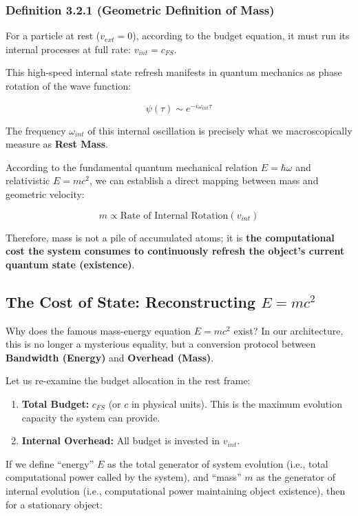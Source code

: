 \documentclass[11pt,a4paper,twoside]{book}
\begin{document}
\subsubsection{Definition 3.2.1 (Geometric Definition of Mass)}

For a particle at rest (\textbf{$v_{ext}=0$}), according to the budget equation, it must run its internal processes at full rate: \textbf{$v_{int} = c_{FS}$}.

This high-speed internal state refresh manifests in quantum mechanics as phase rotation of the wave function:

$$\psi(\tau) \sim e^{-i \omega_{int} \tau}$$

The frequency \textbf{$\omega_{int}$} of this internal oscillation is precisely what we macroscopically measure as \textbf{Rest Mass}.

According to the fundamental quantum mechanical relation \textbf{$E = \hbar \omega$} and relativistic \textbf{$E = mc^2$}, we can establish a direct mapping between mass and geometric velocity:

$$m \propto \text{Rate of Internal Rotation} (v_{int})$$

Therefore, mass is not a pile of accumulated atoms; it is \textbf{the computational cost the system consumes to continuously refresh the object's current quantum state (existence)}.

\subsection{The Cost of State: Reconstructing $E=mc^2$}

Why does the famous mass-energy equation \textbf{$E=mc^2$} exist? In our architecture, this is no longer a mysterious equality, but a conversion protocol between \textbf{Bandwidth (Energy)} and \textbf{Overhead (Mass)}.

Let us re-examine the budget allocation in the rest frame:

\begin{enumerate}
\item \textbf{Total Budget:} \textbf{$c_{FS}$} (or \textbf{$c$} in physical units). This is the maximum evolution capacity the system can provide.

\item \textbf{Internal Overhead:} All budget is invested in \textbf{$v_{int}$}.
\end{enumerate}

If we define ``energy'' \textbf{$E$} as the total generator of system evolution (i.e., total computational power called by the system), and ``mass'' \textbf{$m$} as the generator of internal evolution (i.e., computational power maintaining object existence), then for a stationary object:
\end{document}
